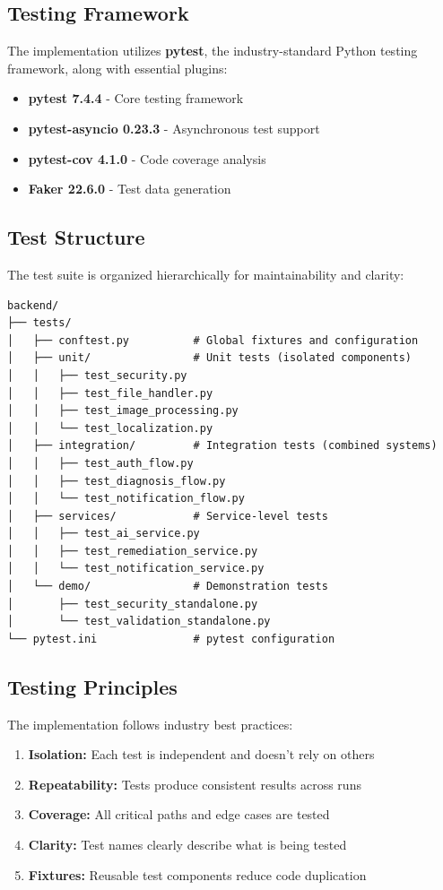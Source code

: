 \documentclass[12pt,a4paper]{article}
\begin{document}
\subsection{Testing Framework}

The implementation utilizes \textbf{pytest}, the industry-standard Python testing framework, along with essential plugins:

\begin{itemize}
    \item \textbf{pytest 7.4.4} - Core testing framework
    \item \textbf{pytest-asyncio 0.23.3} - Asynchronous test support
    \item \textbf{pytest-cov 4.1.0} - Code coverage analysis
    \item \textbf{Faker 22.6.0} - Test data generation
\end{itemize}

\subsection{Test Structure}

The test suite is organized hierarchically for maintainability and clarity:

\begin{verbatim}
backend/
├── tests/
│   ├── conftest.py          # Global fixtures and configuration
│   ├── unit/                # Unit tests (isolated components)
│   │   ├── test_security.py
│   │   ├── test_file_handler.py
│   │   ├── test_image_processing.py
│   │   └── test_localization.py
│   ├── integration/         # Integration tests (combined systems)
│   │   ├── test_auth_flow.py
│   │   ├── test_diagnosis_flow.py
│   │   └── test_notification_flow.py
│   ├── services/            # Service-level tests
│   │   ├── test_ai_service.py
│   │   ├── test_remediation_service.py
│   │   └── test_notification_service.py
│   └── demo/                # Demonstration tests
│       ├── test_security_standalone.py
│       └── test_validation_standalone.py
└── pytest.ini               # pytest configuration
\end{verbatim}

\subsection{Testing Principles}

The implementation follows industry best practices:

\begin{enumerate}
    \item \textbf{Isolation:} Each test is independent and doesn't rely on others
    \item \textbf{Repeatability:} Tests produce consistent results across runs
    \item \textbf{Coverage:} All critical paths and edge cases are tested
    \item \textbf{Clarity:} Test names clearly describe what is being tested
    \item \textbf{Fixtures:} Reusable test components reduce code duplication
\end{enumerate}
\end{document}
